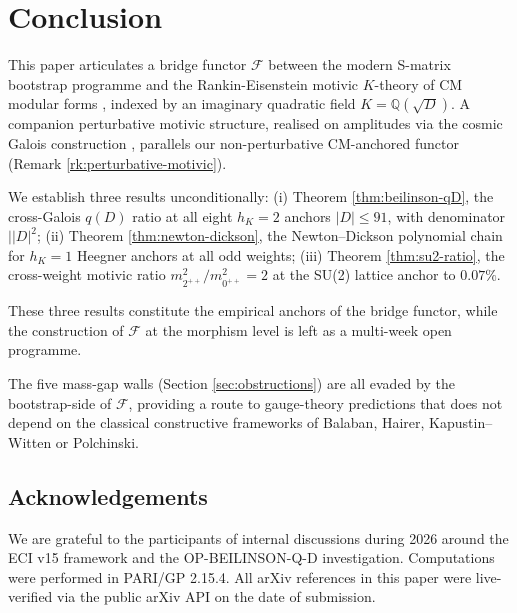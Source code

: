 \documentclass[11pt]{amsart}
\theoremstyle{definition}
\theoremstyle{remark}
\newcommand{\Q}{\mathbb{Q}}
\begin{document}
\section{Conclusion}\label{sec:conclusion}

This paper articulates a bridge functor $\mathcal{F}$ between the
modern S-matrix bootstrap programme \cite{PaulosI, PaulosII, PaulosIII,
CordovaHeKruczenskiVieira, EliasMiroFluxTube, HeKruczenski23,
HeKruczenski24, KazakovZheng2024}
and the Rankin-Eisenstein motivic $K$-theory of CM modular forms
\cite{Beilinson1985, Schutt2008, BrunaultChida2015, KingsSprang2025},
indexed by an imaginary quadratic field $K = \Q(\sqrt{D})$. A
companion perturbative motivic structure, realised on amplitudes via
the cosmic Galois construction \cite{Brown2016CosmicGalois,
BrownDupont2019, CaronHuotDixon2020}, parallels our non-perturbative
CM-anchored functor (Remark \ref{rk:perturbative-motivic}).

We establish three results unconditionally:
(i) Theorem \ref{thm:beilinson-qD}, the cross-Galois $q(D)$ ratio at all
eight $h_K = 2$ anchors $|D| \le 91$, with denominator $\mid |D|^2$;
(ii) Theorem \ref{thm:newton-dickson}, the Newton--Dickson polynomial
chain for $h_K = 1$ Heegner anchors at all odd weights;
(iii) Theorem \ref{thm:su2-ratio}, the cross-weight motivic ratio
$m_{2^{++}}^2 / m_{0^{++}}^2 = 2$ at the SU(2) lattice anchor
\cite{Athenodorou2021} to $0.07\%$.

These three results constitute the empirical anchors of the
bridge functor, while the construction of $\mathcal{F}$ at the
morphism level is left as a multi-week open programme.

The five mass-gap walls (Section \ref{sec:obstructions}) are all
evaded by the bootstrap-side of $\mathcal{F}$, providing a route
to gauge-theory predictions that does not depend on the
classical constructive frameworks of Balaban, Hairer, Kapustin--Witten
or Polchinski.

\subsection*{Acknowledgements}
We are grateful to the participants of internal discussions during
2026 around the ECI v15 framework and the OP-BEILINSON-Q-D
investigation. Computations were performed in PARI/GP 2.15.4. All
arXiv references in this paper were live-verified via the public
arXiv API on the date of submission.
\end{document}
